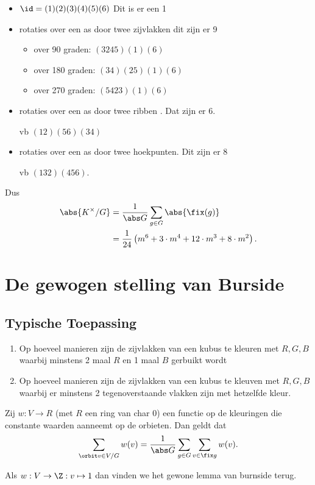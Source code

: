 \begin{itemize}
	\item $\id = (1)(2)(3)(4)(5)(6)$ Dit is er een 1
	\item rotaties over een as door twee zijvlakken dit zijn er 9
		 \begin{itemize}
			 \item over 90 graden: $(3245)(1)(6)$
			 \item over 180 graden: $(34)(25)(1)(6)$
			 \item over 270 graden: $(5423)(1)(6)$
		\end{itemize}
		
	\item rotaties over een as door twee ribben . Dat zijn er 6.

		vb $(12)(56)(34)$
	\item rotaties over een as door twee hoekpunten. Dit zijn er 8

		vb $(132)(456)$.
\end{itemize}
Dus
\begin{align*}
	\abs{K^{\times }/ G} &= \frac{1}{\abs G } \sum_{g \in G}\abs{\fix(g)} \\
			     &= \frac{1}{24}\left(m^{6} + 3\cdot m^{4} + 12 \cdot m^{3} + 8 \cdot m^{2}\right) 
.\end{align*}
\section{De gewogen stelling van Burside } \label{sec:de_gewogen_stelling_van_burside_}
\subsection{Typische Toepassing} \label{sec:toepassin}
\begin{vb}
	\begin{enumerate}
		\item Op hoeveel manieren zijn de zijvlakken van een kubus te kleuren met $R, G, B$ waarbij minstens 2 maal $R$ en 1 maal $B$ gerbuikt wordt
		\item
Op hoeveel manieren zijn de zijvlakken van een kubus te kleuven met $R, G, B$ waarbij er minstens 2 tegenoverstaande vlakken zijn met hetzelfde kleur.	
	\end{enumerate}
\end{vb}
\begin{lemma}
	Zij $w: V \to R$ (met $R$ een ring van char 0) een functie op de kleuringen die constante waarden aanneemt op de orbieten.
	Dan geldt dat \[
		\sum_{\orbit v \in V / G} w(v) = \frac{1}{\abs G} \sum_{g \in G} \sum_{v \in \fix g} w (v)
	.\] 
\end{lemma}
\begin{opmerking}
Als $w: V \to \Z: v \mapsto  1$ dan vinden we het gewone lemma van burnside terug.	
\end{opmerking}

